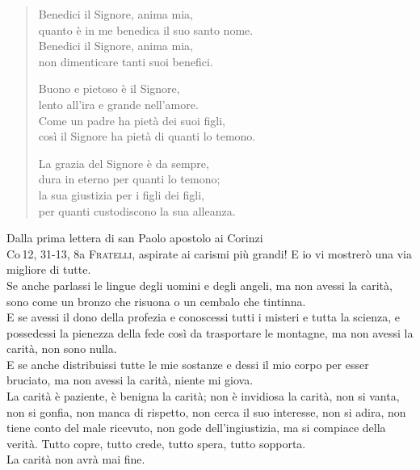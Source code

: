 \documentclass[11pt]{book}
\begin{document}
\noindent\rispostasalmo

\nobreak
\begin{verse}
Benedici il Signore, anima mia,\\
quanto è in me benedica il suo santo nome.\\
Benedici il Signore, anima mia,\\
non dimenticare tanti suoi benefici.\\
\rispostasalmo

Buono e pietoso è il Signore,\\
lento all'ira e grande nell'amore.\\
Come un padre ha pietà dei suoi figli,\\
così il Signore ha pietà di quanti lo temono.\\
\rispostasalmo

La grazia del Signore è da sempre,\\
dura in eterno per quanti lo temono;\\
la sua giustizia per i figli dei figli,\\
per quanti custodiscono la sua alleanza.\\
\rispostasalmo
\end{verse}

\begin{lettura}{Dalla prima lettera di san Paolo apostolo ai Corinzi\\}{Co\,12, 31-13, 8a}
\lettrine[lines=3]{F}{ratelli}, aspirate ai carismi più grandi! E io vi mostrerò una via migliore di tutte.\\

Se anche parlassi le lingue degli uomini e degli angeli, ma non avessi la carità, sono come un bronzo che risuona o un cembalo che tintinna.\\

E se avessi il dono della profezia e conoscessi tutti i misteri e tutta la scienza, e possedessi la pienezza della fede così da trasportare le montagne, ma non avessi la carità, non sono nulla.\\

E se anche distribuissi tutte le mie sostanze e dessi il mio corpo per esser bruciato, ma non avessi la carità, niente mi giova.\\

La carità è paziente, è benigna la carità; non è invidiosa la carità, non si vanta, non si gonfia, non manca di rispetto, non cerca il suo interesse, non si adira, non tiene conto del male ricevuto, non gode dell'ingiustizia, ma si compiace della verità. Tutto copre, tutto crede, tutto spera, tutto sopporta.\\

La carità non avrà mai fine.\\
\end{lettura}
\end{document}
